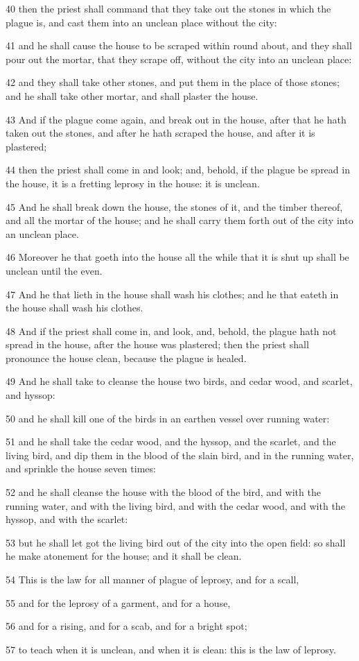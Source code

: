 \par 40 then the priest shall command that they take out the stones in which the plague is, and cast them into an unclean place without the city:
\par 41 and he shall cause the house to be scraped within round about, and they shall pour out the mortar, that they scrape off, without the city into an unclean place:
\par 42 and they shall take other stones, and put them in the place of those stones; and he shall take other mortar, and shall plaster the house.
\par 43 And if the plague come again, and break out in the house, after that he hath taken out the stones, and after he hath scraped the house, and after it is plastered;
\par 44 then the priest shall come in and look; and, behold, if the plague be spread in the house, it is a fretting leprosy in the house: it is unclean.
\par 45 And he shall break down the house, the stones of it, and the timber thereof, and all the mortar of the house; and he shall carry them forth out of the city into an unclean place.
\par 46 Moreover he that goeth into the house all the while that it is shut up shall be unclean until the even.
\par 47 And he that lieth in the house shall wash his clothes; and he that eateth in the house shall wash his clothes.
\par 48 And if the priest shall come in, and look, and, behold, the plague hath not spread in the house, after the house was plastered; then the priest shall pronounce the house clean, because the plague is healed.
\par 49 And he shall take to cleanse the house two birds, and cedar wood, and scarlet, and hyssop:
\par 50 and he shall kill one of the birds in an earthen vessel over running water:
\par 51 and he shall take the cedar wood, and the hyssop, and the scarlet, and the living bird, and dip them in the blood of the slain bird, and in the running water, and sprinkle the house seven times:
\par 52 and he shall cleanse the house with the blood of the bird, and with the running water, and with the living bird, and with the cedar wood, and with the hyssop, and with the scarlet:
\par 53 but he shall let got the living bird out of the city into the open field: so shall he make atonement for the house; and it shall be clean.
\par 54 This is the law for all manner of plague of leprosy, and for a scall,
\par 55 and for the leprosy of a garment, and for a house,
\par 56 and for a rising, and for a scab, and for a bright spot;
\par 57 to teach when it is unclean, and when it is clean: this is the law of leprosy.


